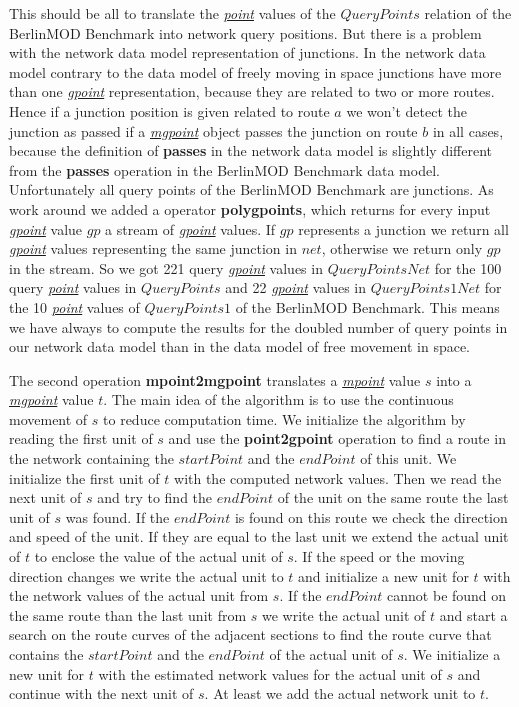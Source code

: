 \documentclass[a4paper]{article}
\newcommand{\bmodb} {BerlinMOD Benchmark}
\newcommand{\op}[1]{\textbf{#1}}
\newcommand{\dt}[1]{\textsl{\underline{#1}}}
\begin{document}
{This should be all to translate the \dt{point} values of the $QueryPoints$
relation of the \bmodb{} into network query positions. But there is a problem with
the network data model representation of junctions. In the network data model
contrary to the data model of freely moving in space junctions have more than one
\dt{gpoint} representation, because they are related to two or more routes. Hence
if a junction position is given related to route $a$ we won't detect the
junction as passed if a \dt{mgpoint} object passes the junction on route $b$
in all cases, because the definition of \op{passes} in the network data model is
slightly different from the \op{passes} operation in the \bmodb{} data model.
Unfortunately all query points of the \bmodb{} are junctions. As work around we
added a operator \op{polygpoints}, which returns for every input \dt{gpoint}
value $gp$ a stream of \dt{gpoint} values. If $gp$ represents a junction
 we return all \dt{gpoint} values representing the same junction in $net$,
otherwise we return only $gp$ in the stream. So we got 221 query \dt{gpoint}
values in $QueryPointsNet$ for the 100 query \dt{point} values in
$QueryPoints$ and 22 \dt{gpoint} values in $QueryPoints1Net$ for the
10 \dt{point} values of $QueryPoints1$ of the \bmodb{}. This means we have
always to compute the results for the doubled number of query points in our network
data model than in the data model of free movement in space.

The second operation \op{mpoint2mgpoint} translates a \dt{mpoint} value $s$
into a \dt{mgpoint} value $t$. The main idea of the algorithm is to use the
continuous movement of $s$ to reduce computation time. We initialize the
algorithm by reading the first unit of $s$ and use the \op{point2gpoint}
operation to find a route in the network containing the $startPoint$ and
the $endPoint$ of this unit. We initialize the first unit of $t$ with
the computed network values. Then we read the next unit of $s$ and try to find
the $endPoint$ of the unit on the same route the last unit of $s$ was
found. If the $endPoint$ is found on this route we check the direction and
 speed of the unit. If they are equal to the last unit we extend the actual unit
of $t$ to enclose the value of the actual unit of $s$. If the speed or
the moving direction changes we write the actual unit to $t$ and initialize
a new unit for $t$ with the network values of the actual unit from $s$.
If the $endPoint$ cannot be found on the same route than the last unit from
$s$ we write the actual unit of $t$ and start a search on the route curves
of the adjacent sections to find the route curve that contains the $startPoint$
 and the $endPoint$ of the actual unit of $s$. We initialize a new unit
for $t$ with the estimated network values for the actual unit of $s$ and
 continue with the next unit of $s$. At least we add the actual network unit
to $t$.

}
\end{document}

